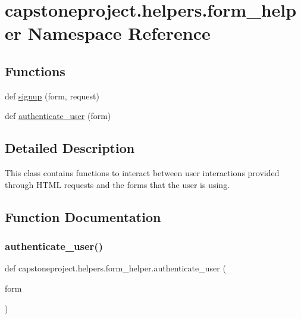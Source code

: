 \hypertarget{namespacecapstoneproject_1_1helpers_1_1form__helper}{}\section{capstoneproject.\+helpers.\+form\+\_\+helper Namespace Reference}
\label{namespacecapstoneproject_1_1helpers_1_1form__helper}
\subsection*{Functions}
\begin{DoxyCompactItemize}
\item 
def \mbox{\hyperlink{namespacecapstoneproject_1_1helpers_1_1form__helper_aa06dc0a0cc29411b56da354a8a844a7b}{signup}} (form, request)
\item 
def \mbox{\hyperlink{namespacecapstoneproject_1_1helpers_1_1form__helper_aa1bad910ca4cb4dd4365d0e62e43d77c}{authenticate\+\_\+user}} (form)
\end{DoxyCompactItemize}


\subsection{Detailed Description}
\begin{DoxyVerb}This class contains functions to interact between user interactions provided through HTML requests and the forms that
the user is using.
\end{DoxyVerb}
 

\subsection{Function Documentation}
\mbox{\label{namespacecapstoneproject_1_1helpers_1_1form__helper_aa1bad910ca4cb4dd4365d0e62e43d77c}} 
\subsubsection{\texorpdfstring{authenticate\+\_\+user()}{authenticate\_user()}}
{\footnotesize\ttfamily def capstoneproject.\+helpers.\+form\+\_\+helper.\+authenticate\+\_\+user (\begin{DoxyParamCaption}\item[{}]{form }\end{DoxyParamCaption})}

